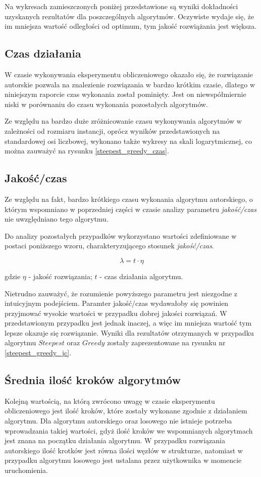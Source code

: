 Na wykresach zamieszczonych poniżej przedstawione są wyniki dokładności
uzyskanych rezultatów dla poszczególnych algorytmów. Oczywiste wydaje się,
że im mniejsza wartość odległości od optimum, tym jakość rozwiążania
jest większa.



\subsection{Czas działania}

W czasie wykonywania eksperymentu obliczeniowego okazało się, że
rozwiązanie autorskie pozwala na znalezienie rozwiązania w bardzo
krótkim czasie, dlatego w niniejszym raporcie czas wykonania
został pominięty. Jest on niewspółmiernie niski w porównaniu do
czasu wykonania pozostałych algorytmów.

Ze względu na bardzo duże zróżnicowanie czasu wykonywania algorytmów
w zależności od rozmiaru instancji, oprócz wyników przedstawionych
na standardowej osi liczbowej, wykonano także wykresy na skali
logarytmicznej, co można zauważyć na rysunku \ref{steepest_greedy_czas}.

\subsection{Jakość/czas}

Ze względu na fakt, bardzo krótkiego czasu wykonania algorytmu
autorskiego, o którym wspomniano w poprzedniej części w czasie analizy
parametru \emph{jakość/czas} nie uwzględniano tego algorytmu.

Do analizy pozostałych przypadków wykorzystano wartości zdefiniowane
w postaci poniższego wzoru, charakteryzującego stosunek \emph{jakość/czas}.

$$
	\lambda = t \cdot \eta
$$

gdzie $\eta$ - jakość rozwiązania; $t$ - czas działania algorytmu.

Nietrudno zauważyć, że rozumienie powyższego parametru jest niezgodne
z intuicyjnym podejściem. Paramter jakość/czas wydawałoby się powinien
przyjmować wysokie wartości w przypadku dobrej jakości rozwiązań. W
przedstawionym przypadku jest jednak inaczej, a więc im mniejsza
wartość tym lepsze okazuje się rozwiązanie. Wyniki
dla rezultatów otrzymanych w przypadku algorytmu $Steepest$ oraz
$Greedy$ zostały zaprezentowane na rysunku nr \ref{steepest_greedy_jc}.

\subsection{Średnia ilość kroków algorytmów}

Kolejną wartością, na którą zwrócono uwagę w czasie eksperymentu
obliczeniowego jest ilość kroków, które zostały wykonane zgodnie
z działaniem algorytmu. Dla algorytmu autorskiego oraz losowego
nie istnieje potrzeba wprowadzania takiej wartości, gdyż ilość
kroków we wspomnianych algorytmach jest znana na początku działania
algorytmu. W przypadku rozwiązania autorskiego ilość krotków jest
równa ilości węzłów w strukturze, natomiast w przypadku algorytmu
losowego jest ustalana przez użytkownika w momencie uruchomienia.
